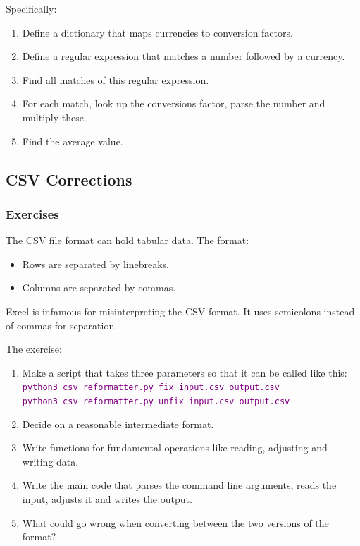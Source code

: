 {\begin{frame}[fragile]
    \vspace{5mm}
    Specifically:
    \begin{enumerate}
      \item Define a dictionary that maps currencies to conversion factors.
      \item Define a regular expression that matches a number followed by a currency.
      \item Find all matches of this regular expression.
      \item For each match, look up the conversions factor, parse the number and multiply these.
      \item Find the average value.
    \end{enumerate}
\end{frame}

\subsection{CSV Corrections}
\begin{frame}[fragile]
    \frametitle{Exercises }
    \vspace{-1mm}
    The CSV file format can hold tabular data. The format:
    \begin{itemize}
      \item Rows are separated by linebreaks.
      \item Columns are separated by commas.
    \end{itemize}
    
    \vspace{2mm}
    Excel is infamous for misinterpreting the CSV format. It uses semicolons instead of commas for separation.
    
    \vspace{2mm}
    The exercise:
    \begin{enumerate}
      \item Make a script that takes three parameters so that it can be called like this: \\
        \textcolor{purple}{\texttt{python3 csv\_reformatter.py fix input.csv output.csv}} \\
        \textcolor{purple}{\texttt{python3 csv\_reformatter.py unfix input.csv output.csv}}
      \item Decide on a reasonable intermediate format.
      \item Write functions for fundamental operations like reading, adjusting and writing data.
      \item Write the main code that parses the command line arguments, reads the input, adjusts it and writes the output.
      \item What could go wrong when converting between the two versions of the format?
    \end{enumerate}
\end{frame}

}
